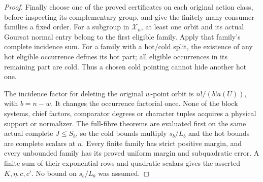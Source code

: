\begin{proof}
Finally choose one of the proved certificates on each original
action class, before inspecting its complementary group, and give
the finitely many consumer families a fixed order. For a subgroup
in $\mathcal X_n$, at least one orbit and its actual Goursat normal
entry belong to the first eligible family. Apply that family's
complete incidence sum. For a family with a hot/cold split, the
existence of any hot eligible occurrence defines its hot part;
all eligible occurrences in its remaining part are cold. Thus a
chosen cold pointing cannot hide another hot one.

The incidence factor for deleting the original $w$-point orbit is
$n!/(b!a(U))$, with $b=n-w$. It changes the occurrence factorial
once. None of the block systems, chief factors, comparator degrees
or character tuples acquires a physical support or normalizer.
The full-fibre theorems are evaluated first on the same actual
complete $J\leq S_b$, so the cold bounds multiply $s_b/L_b$ and
the hot bounds are complete scalars at $n$. Every finite family
has strict positive margin, and every unbounded family has its
proved uniform margin and subquadratic error. A finite sum of
their exponential rows and quadratic scalars gives the asserted
$K,\eta,c,c'$. No bound on $s_b/L_b$ was assumed.
\end{proof}
